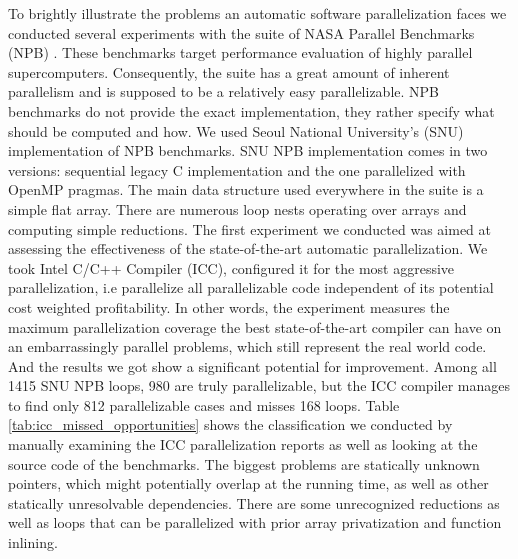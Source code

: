 \quad To brightly illustrate the problems an automatic software parallelization faces we conducted several experiments with the suite of NASA Parallel Benchmarks (NPB) \cite{nasa-parallel-benchmarks}. These benchmarks target performance evaluation of highly parallel supercomputers. Consequently, the suite has a great amount of inherent parallelism and is supposed to be a relatively easy parallelizable. NPB benchmarks do not provide the exact implementation, they rather specify what should be computed and how. We used Seoul National University's (SNU) implementation \cite{snu-npb-benchmarks} of NPB benchmarks. SNU NPB implementation comes in two versions: sequential legacy C implementation and the one parallelized with OpenMP pragmas. The main data structure used everywhere in the suite is a simple flat array. There are numerous loop nests operating over arrays and computing simple reductions.\newline\null
\quad The first experiment we conducted was aimed at assessing the effectiveness of the state-of-the-art automatic parallelization. We took Intel C/C++ Compiler (ICC), configured it for the most aggressive parallelization, i.e parallelize all parallelizable code independent of its potential cost weighted profitability. In other words, the experiment measures the maximum parallelization coverage the best state-of-the-art compiler can have on an embarrassingly parallel problems, which still represent the real world code. And the results we got show a significant potential for improvement. Among all 1415 SNU NPB loops, 980 are truly parallelizable, but the ICC compiler manages to find only 812 parallelizable cases and misses 168 loops. Table \ref{tab:icc_missed_opportunities} shows the classification we conducted by manually examining the ICC parallelization reports as well as looking at the source code of the benchmarks. The biggest problems are statically unknown pointers, which might potentially overlap at the running time, as well as other statically unresolvable dependencies. There are some unrecognized reductions as well as loops that can be parallelized with prior array privatization and function inlining.
